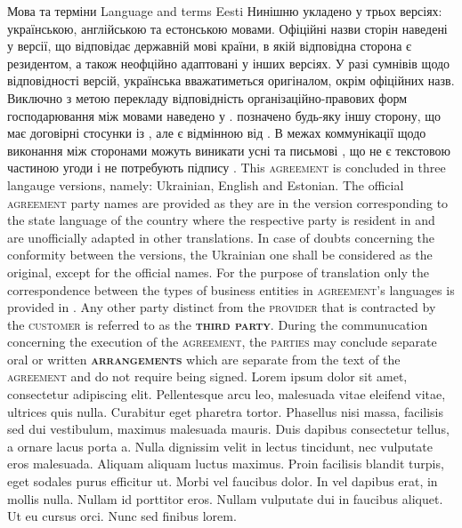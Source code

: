\begin{Form}
\begin{paracol}{3}
      \clause
        {Мова та терміни}
        {Language and terms}
        {Eesti}
        {Нинішню  укладено у трьох версіях: українською, англійською та естонською мовами. Офіційні назви сторін  наведені у версії, що відповідає державній мові країни, в якій відповідна сторона є резидентом, а також неофційно адаптовані у інших версіях. У разі сумнівів щодо відповідності версій, українська вважатиметься оригіналом, окрім офіційних назв. Виключно з метою перекладу відповідність ор\-га\-ні\-за\-цій\-но-правових форм господарювання між мовами  наведено у . \textbf{} позначено будь-яку іншу сторону, що має договірні стосунки із , але є відмінною від . В межах коммунікації щодо виконання  між сторонами можуть виникати усні та письмові \textbf{}, що не є текстовою частиною угоди і не потребують підпису .
        }
        {This \textsc{agreement} is concluded in three langauge versions, na\-me\-ly: Ukrainian, English and Estonian. The official \textsc{agreement} party names are provided as they are in the version corresponding to the state language of the country where the respective party is resident in and are unofficially adapted in other translations. In case of doubts concerning the conformity between the versions, the Ukrainian one shall be considered as the original, except for the official names. For the purpose of translation only the correspondence between the types of business entities in \textsc{agreement}'s languages is provided in . Any other party distinct from the \textsc{provider} that is contracted by the \textsc{customer} is referred to as the \textbf{\textsc{third party}}. During the communucation concerning the execution of the \textsc{agreement}, the \textsc{parties} may conclude separate oral or written \textbf{\textsc{arrangements}} which are separate from the text of the \textsc{agreement} and do not require being signed.
        }
        {Lorem ipsum dolor sit amet, consectetur adipiscing elit. Pellentesque arcu leo, malesuada vitae eleifend vitae, ultrices quis nulla. Curabitur eget pharetra tortor. Phasellus nisi massa, facilisis sed dui vestibulum, maximus malesuada mauris. Duis dapibus consectetur tellus, a ornare lacus porta a. Nulla dignissim velit in lectus tincidunt, nec vulputate eros malesuada. Aliquam aliquam luctus maximus. Proin facilisis blandit turpis, eget sodales purus efficitur ut. Morbi vel faucibus dolor. In vel dapibus erat, in mollis nulla. Nullam id porttitor eros. Nullam vulputate dui in faucibus aliquet. Ut eu cursus orci. Nunc sed finibus lorem.}

\end{paracol}
\end{Form}
